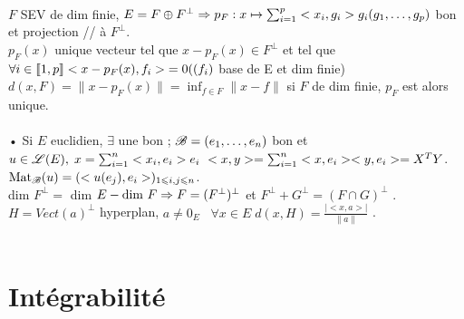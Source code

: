 \documentclass[12 pt]{exampleclass}
\begin{document}
\text{}\\
$F$ SEV de dim finie, $E=F\oplus F^\perp \Rightarrow p_F : x \mapsto \sum_{i=1}^p <x_i,g_i>g_i \\ (g_1,\dots,g_p)$ bon et projection // à $F^\perp$.\\
$p_F(x)$ unique vecteur tel que $x-p_F(x)\in F^\perp$ et tel que $\forall i\in \llbracket 1,p\rrbracket < x -p_F(x), f_i> \; = 0 \\ ((f_i)$ base de E et dim finie)\\
$d(x,F) = \| x - p_F(x) \| = \inf_{f\in F} \|x-f\|$ si $F$ de dim finie, $p_F$ est alors unique.\\
\text{}\\
• Si $E$ euclidien, $\exists$ une bon  ;  $\mathscr{B} =(e_1,\dots,e_n)$ bon et $u\in\mathscr{L}(E),\\
\; x=\sum_{i=1}^n <x_i,e_i> e_i  \ <x,y> = \sum_{i=1}^n <x,e_i><y,e_i> = X^T Y$.\\
$\text{Mat}_{\mathscr{B}} (u) = (<u(e_j), e_i> )_{1\leqslant i,j \leqslant n}$.\\
dim $F^\perp = $ dim $E - \text{dim } F \Rightarrow F = (F^\perp)^\perp$ et $F^\perp + G^\perp = (F\cap G)^\perp$ .\\
$H = Vect(a)^\perp$ hyperplan, $a\neq 0_E$ \ $\forall x\in E \; d(x,H) = \frac{|<x,a>|}{\|a\|}$ .\\
\text{}\\
\section{Intégrabilité}
\end{document}
